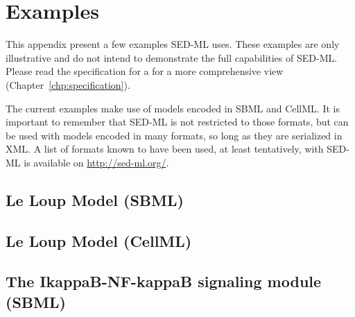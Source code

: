 \chapter{Examples}

This appendix present a few examples SED-ML uses. These examples are only illustrative and do not intend to demonstrate the full capabilities of SED-ML. Please read the specification for  a for a more comprehensive view (Chapter~\ref{chp:specification}). 

The current examples make use of models encoded in SBML and CellML. It is important to remember that SED-ML is not restricted to those formats, but can be used with models encoded in many formats, so long as they are serialized in XML. A list of formats known to have been used, at least tentatively, with SED-ML is available on \url{http://sed-ml.org/}.

\section{Le Loup Model (SBML)}


\section{Le Loup Model (CellML)}


\newpage
\section{The IkappaB-NF-kappaB signaling module (SBML)}


